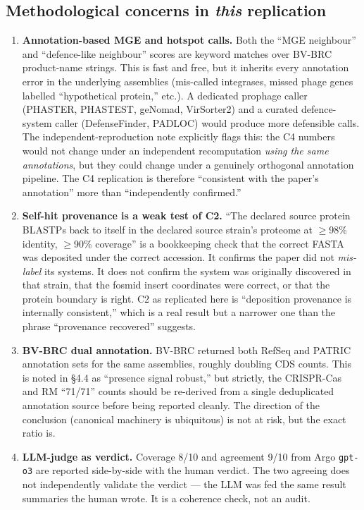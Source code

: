 \documentclass[11pt,letterpaper]{article}
\begin{document}
\subsection*{Methodological concerns in \textit{this} replication}
\begin{enumerate}
\item \textbf{Annotation-based MGE and hotspot calls.} Both the ``MGE neighbour'' and ``defence-like neighbour'' scores are keyword matches over BV-BRC product-name strings. This is fast and free, but it inherits every annotation error in the underlying assemblies (mis-called integrases, missed phage genes labelled ``hypothetical protein,'' etc.). A dedicated prophage caller (PHASTER, PHASTEST, geNomad, VirSorter2) and a curated defence-system caller (DefenseFinder, PADLOC) would produce more defensible calls. The independent-reproduction note explicitly flags this: the C4 numbers would not change under an independent recomputation \textit{using the same annotations}, but they could change under a genuinely orthogonal annotation pipeline. The C4 replication is therefore ``consistent with the paper's annotation'' more than ``independently confirmed.''
\item \textbf{Self-hit provenance is a weak test of C2.} ``The declared source protein BLASTPs back to itself in the declared source strain's proteome at $\ge$98\% identity, $\ge$90\% coverage'' is a bookkeeping check that the correct FASTA was deposited under the correct accession. It confirms the paper did not \textit{mis-label} its systems. It does not confirm the system was originally discovered in that strain, that the fosmid insert coordinates were correct, or that the protein boundary is right. C2 as replicated here is ``deposition provenance is internally consistent,'' which is a real result but a narrower one than the phrase ``provenance recovered'' suggests.
\item \textbf{BV-BRC dual annotation.} BV-BRC returned both RefSeq and PATRIC annotation sets for the same assemblies, roughly doubling CDS counts. This is noted in \S4.4 as ``presence signal robust,'' but strictly, the CRISPR-Cas and RM ``71/71'' counts should be re-derived from a single deduplicated annotation source before being reported cleanly. The direction of the conclusion (canonical machinery is ubiquitous) is not at risk, but the exact ratio is.
\item \textbf{LLM-judge as verdict.} Coverage 8/10 and agreement 9/10 from Argo \texttt{gpt-o3} are reported side-by-side with the human verdict. The two agreeing does not independently validate the verdict --- the LLM was fed the same result summaries the human wrote. It is a coherence check, not an audit.

\end{enumerate}
\end{document}

